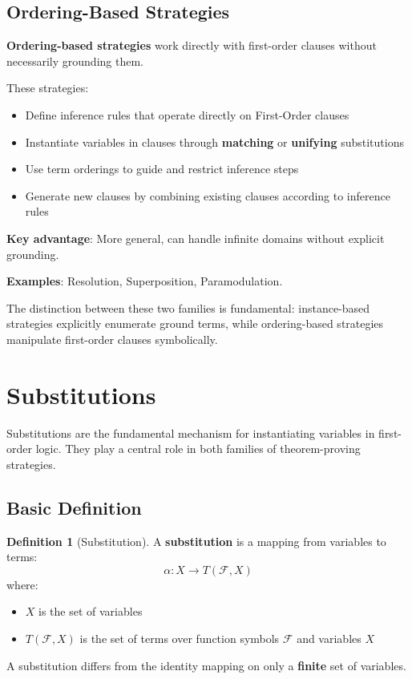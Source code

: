\documentclass[11pt,a4paper]{article}
\theoremstyle{definition}
\newtheorem{definition}{Definition}[section]
\theoremstyle{plain}
\theoremstyle{remark}
\begin{document}
\subsection{Ordering-Based Strategies}

\textbf{Ordering-based strategies} work directly with first-order clauses without necessarily grounding them.

\begin{tcolorbox}[colback=orange!5!white,colframe=orange!75!black,title=\textbf{Ordering-Based Approach}]
These strategies:
\begin{itemize}
    \item Define inference rules that operate directly on First-Order clauses
    \item Instantiate variables in clauses through \textbf{matching} or \textbf{unifying} substitutions
    \item Use term orderings to guide and restrict inference steps
    \item Generate new clauses by combining existing clauses according to inference rules
\end{itemize}

\textbf{Key advantage}: More general, can handle infinite domains without explicit grounding.

\textbf{Examples}: Resolution, Superposition, Paramodulation.
\end{tcolorbox}

The distinction between these two families is fundamental: instance-based strategies explicitly enumerate ground terms, while ordering-based strategies manipulate first-order clauses symbolically.

\section{Substitutions}

Substitutions are the fundamental mechanism for instantiating variables in first-order logic. They play a central role in both families of theorem-proving strategies.

\subsection{Basic Definition}

\begin{tcolorbox}[colback=purple!5!white,colframe=purple!75!black,title=\textbf{Substitution}]
\begin{definition}[Substitution]
A \textbf{substitution} is a mapping from variables to terms:
\[ \alpha: X \to T(\mathcal{F}, X) \]
where:
\begin{itemize}
    \item $X$ is the set of variables
    \item $T(\mathcal{F}, X)$ is the set of terms over function symbols $\mathcal{F}$ and variables $X$
\end{itemize}

A substitution differs from the identity mapping on only a \textbf{finite} set of variables.
\end{definition}
\end{tcolorbox}
\end{document}
